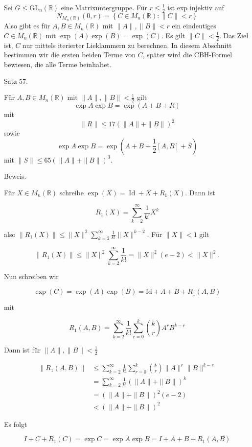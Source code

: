 \documentclass[10pt, letterpaper]{article}
\begin{document}
Sei $G \leq \mathrm{GL}_{n}(\mathbb{R})$ eine Matrixuntergruppe. Für $r \leq \frac{1}{2}$ ist exp injektiv auf 
$$N_{M_{n}(\mathbb{R})}(0, r)=\left\{C \in M_{n}(\mathbb{R}):\|C\|<r\right\}$$ 
Also gibt es für $A, B \in M_{n}(\mathbb{R})$ mit $\|A\|,\|B\|<r$ ein eindeutiges $C \in M_{n}(\mathbb{R})$ mit $\exp (A) \exp (B)=\exp (C)$. Es gilt $\|C\|<\frac{1}{2}$. Das Ziel ist, $C$ nur mittels iterierter Lieklammern zu berechnen. In diesem Abschnitt bestimmen wir die ersten beiden Terme von $C$, später wird die CBH-Formel bewiesen, die alle Terme beinhaltet.

Satz 57. 

Für $A, B \in M_{n}(\mathbb{R})$ mit $\|A\|,\|B\|<\frac{1}{2}$ gilt
$$
\exp A \exp B=\exp (A+B+R)
$$
mit
$$
\|R\| \leq 17(\|A\|+\|B\|)^{2}
$$
sowie
$$
\exp A \exp B=\exp \left(A+B+\frac{1}{2}[A, B]+S\right)
$$
mit $\|S\| \leq 65(\|A\|+\|B\|)^{3}$.



Beweis. 

Für $X \in M_{n}(\mathbb{R})$ schreibe $\exp (X)=\operatorname{Id}+X+R_{1}(X)$. Dann ist

$$
R_{1}(X)=\sum_{k=2}^{\infty} \frac{1}{k!} X^{k}
$$

also $\left\|R_{1}(X)\right\| \leq\|X\|^{2} \sum_{k=2}^{\infty} \frac{1}{k!}\|X\|^{k-2}$. Für $\|X\|<1$ gilt

$$
\left\|R_{1}(X)\right\| \leq\|X\|^{2} \sum_{k=2}^{\infty} \frac{1}{k!}=\|X\|^{2}(e-2)<\|X\|^{2} .
$$

Nun schreiben wir

$$
\exp (C)=\exp (A) \exp (B)=\mathrm{Id}+A+B+R_{1}(A, B)
$$

mit

$$
R_{1}(A, B)=\sum_{k=2}^{\infty} \frac{1}{k!} \sum_{r=0}^{k}\binom{k}{r} A^{r} B^{k-r}
$$

Dann ist für $\|A\|,\|B\|<\frac{1}{2}$

$$
\begin{aligned}
\left\|R_{1}(A, B)\right\| & \leq \sum_{k=2}^{\infty} \frac{1}{k!} \sum_{r=0}^{k}\binom{k}{r}\|A\|^{r}\|B\|^{k-r} \\
& =\sum_{k=2}^{\infty} \frac{1}{k!}(\|A\|+\|B\|)^{k} \\
& =(\|A\|+\|B\|)^{2}(e-2) \\
& <(\|A\|+\|B\|)^{2}
\end{aligned}
$$

Es folgt

$$
I+C+R_{1}(C)=\exp C=\exp A \exp B=I+A+B+R_{1}(A, B)
$$
\end{document}

